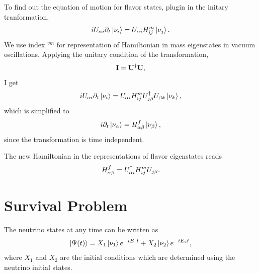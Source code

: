\documentclass[letterpaper,12pt,english]{sphinxmanual}
\newcommand{\ket}[1]{\left| #1\right\rangle}
\begin{document}
To find out the equation of motion for flavor states, plugin in the initary tranformation,
\begin{gather}
\begin{split}i  U_{\alpha i} \partial_t \ket{\nu_i} =  U_{\alpha i}  H^m_{ij} \ket{\nu_j}.\end{split}\notag
\end{gather}
We use index \({}^{vm}\) for representation of Hamiltonian in mass eigenstates in vacuum oscillations. Applying the unitary condition of the transformation,
\begin{gather}
\begin{split}\mathbf I = \mathbf {U^\dagger} \mathbf U,\end{split}\notag
\end{gather}
I get
\begin{gather}
\begin{split}i U_{\alpha i} \partial_t \ket{\nu_i} =  U_{\alpha i} H^m_{i j}  {U^\dagger_{j\beta}}  U_{\beta k} \ket{\nu_k},\end{split}\notag
\end{gather}
which is simplified to
\begin{gather}
\begin{split}i \partial_t \ket{\nu_\alpha} = H^f_{\alpha \beta} \ket{\nu_{\beta}},\end{split}\notag
\end{gather}
since the transformation is time independent.

The new Hamiltonian in the representations of flavor eigenstates reads
\begin{gather}
\begin{split}H^f_{\alpha\beta}  = U^\dagger_{\alpha i} H^m_{ij} U_{j\beta}.\end{split}\notag
\end{gather}

\section{Survival Problem}
\label{vacuum:survival-problem}
The neutrino states at any time can be written as
\begin{gather}
\begin{split}\ket{\Psi(t)}  = X_1 \ket{\nu_1 } e^{-i E_1 t}+ X_2 \ket{ \nu_2 } e^{-i E_2 t},\end{split}\notag
\end{gather}
where \(X_1\) and \(X_2\) are the initial conditions which are determined using the neutrino initial states.
\end{document}
